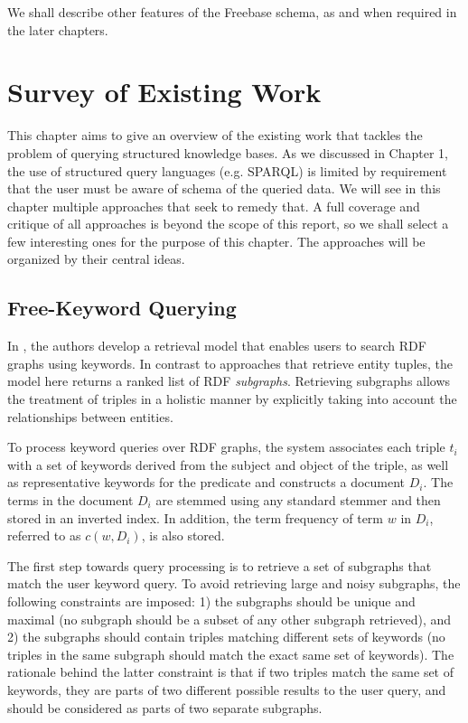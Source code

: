 \documentclass[a4paper, twoside, 12pt]{report}
\begin{document}
We shall describe other features of the Freebase schema, as and when required in the later chapters.



\chapter[Survey]{Survey of Existing Work}

This chapter aims to give an overview of the existing work that tackles the problem of querying structured knowledge bases. As we discussed in Chapter 1, the use of structured query languages (e.g. SPARQL) is limited by requirement that the user must be aware of schema of the queried data. We will see in this chapter multiple approaches that seek to remedy that. A full coverage and critique of all approaches is beyond the scope of this report, so we shall select a few interesting ones for the purpose of this chapter. The approaches will be organized by their central ideas.

\section[Keyword Queries]{Free-Keyword Querying}
 
 In \cite{elbassuoni2011keyword}, the authors develop a retrieval model that enables users to search RDF graphs using keywords. In contrast to approaches that retrieve entity tuples, the model here returns a ranked list of RDF \emph{subgraphs}. Retrieving subgraphs allows the treatment of triples in a holistic manner by explicitly taking into account the relationships between entities.
 
 To process keyword queries over RDF graphs, the system associates each triple $t_i$ with a set of keywords derived from the subject and object of the triple, as well as representative keywords for the predicate and constructs a document $D_i$. The terms in the document $D_i$ are stemmed using any standard stemmer and then stored in an inverted index. In addition, the term frequency of term $w$ in $D_i$, referred to as $c(w, D_i)$, is also stored.
 
 The first step towards query processing is to retrieve a set of subgraphs that match the user keyword query. To avoid retrieving large and noisy subgraphs, the following constraints are imposed: 1) the subgraphs should be unique and maximal (no subgraph should be a subset of any other subgraph retrieved), and 2) the subgraphs should contain triples matching different sets of keywords (no triples in the same subgraph should match the exact same set of keywords). The rationale behind the latter constraint is that if two triples match the same set of keywords, they are parts of two different possible results to the user query, and should be considered as parts of two separate subgraphs.
 
\end{document}
